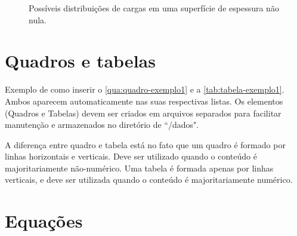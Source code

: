 \begin{figure}[!htb]
    \centering
    \caption{Possíveis distribuições de cargas em uma superfície de espessura não nula.}
    \begin{minipage}{\wd0}
        \vspace{-20pt}
        \label{fig:figura-exemplo-1}
    \end{minipage}
\end{figure}

\section{Quadros e tabelas}
\label{sec:quadrosTabelas}

Exemplo de como inserir o \autoref{qua:quadro-exemplo1} e a \cref{tab:tabela-exemplo1}. Ambos aparecem automaticamente nas suas respectivas listas.
Os elementos (Quadros e Tabelas) devem ser criados em arquivos separados para facilitar manutenção e armazenados no diretório de ``/dados".



A diferença entre quadro e tabela está no fato que um quadro é formado por linhas horizontais e verticais. Deve ser utilizado quando o conteúdo é majoritariamente não-numérico. Uma tabela é formada apenas por linhas verticais, e deve ser utilizada quando o conteúdo é majoritariamente numérico.



\section{Equações}
\label{sec:equacoes}

